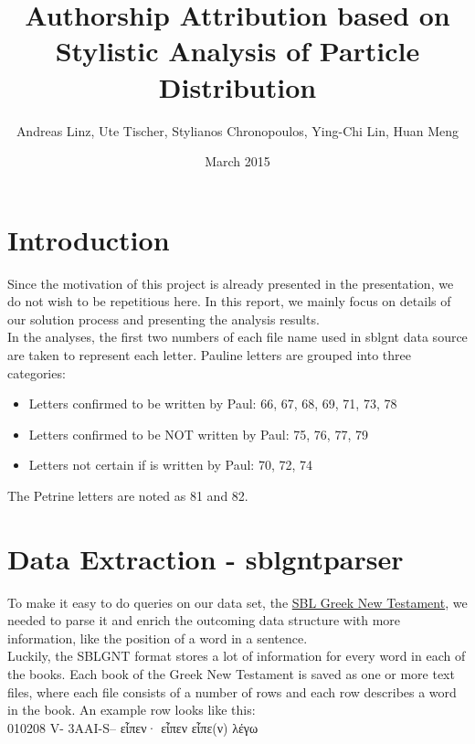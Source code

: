 \documentclass[a4paper]{article}
\begin{document}
\title{Authorship Attribution based on Stylistic Analysis of Particle Distribution}
\author{Andreas Linz, Ute Tischer, Stylianos Chronopoulos, Ying-Chi Lin, Huan Meng}
\date{March 2015}
\maketitle

\section{Introduction}
Since the motivation of this project is already presented in the presentation, we do not wish to be repetitious here. In this report, we mainly focus on details of our solution process and presenting the analysis results. \\

In the analyses, the first two numbers of each file name used in sblgnt data source are taken to represent each letter. Pauline letters are grouped into three categories: \\
\begin{itemize}
\item Letters confirmed to be written by Paul: 66, 67, 68, 69, 71, 73, 78 
\item Letters confirmed to be NOT written by Paul: 75, 76, 77, 79 
\item Letters not certain if is written by Paul: 70, 72, 74
\end{itemize}

The Petrine letters are noted as 81 and 82. \\

\section{Data Extraction - sblgntparser}
To make it easy to do queries on our data set, the \href{https://github.com/morphgnt/sblgnt}{SBL Greek New Testament}, we needed to parse it and enrich the outcoming data structure with more information, like the position of a word in a sentence. \\
Luckily, the SBLGNT format stores a lot of information for every word in each of the books. Each book of the Greek New Testament is saved as one or more text files, where each file consists of a number of rows and each row describes a word in the book. An example row looks like this: \\

010208 V- 3AAI-S-- \textgreek{εἶπεν· εἶπεν εἶπε(ν) λέγω}
\end{document}
